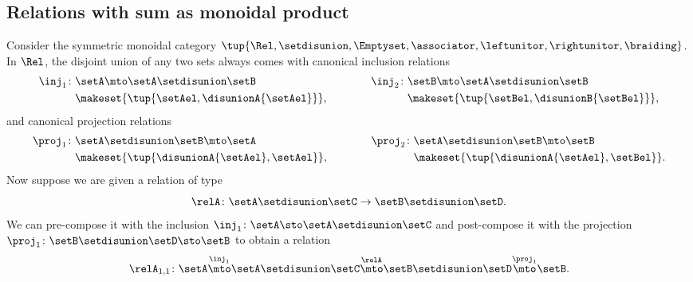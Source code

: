 

\subsection{Relations with sum as monoidal product}

Consider the symmetric monoidal category $\tup{\Rel, \setdisunion, \Emptyset, \associator, \leftunitor, \rightunitor, \braiding}$.
    In $\Rel$, the disjoint union of any two sets always comes with canonical inclusion relations
    \begin{equation}
        \begin{aligned}
            \inj_1 \colon & \setA \mto \setA\setdisunion\setB \\
                             & \makeset{ \tup{\setAel, \disunionA{\setAel}}},
        \end{aligned}
        \qquad \qquad
        \begin{aligned}
            \inj_2 \colon & \setB  \mto \setA\setdisunion\setB \\
                             & \makeset{ \tup{\setBel, \disunionB{\setBel}}},
        \end{aligned}
    \end{equation}
    and canonical projection relations
    \begin{equation}
        \begin{aligned}
            \proj_1 \colon & \setA\setdisunion\setB \mto \setA \\
                              & \makeset{ \tup{\disunionA{\setAel}, \setAel}},
        \end{aligned}
        \qquad \qquad
        \begin{aligned}
            \proj_2 \colon & \setA\setdisunion\setB  \mto \setB \\
                             & \makeset{ \tup{\disunionA{\setAel}, \setBel}}.
        \end{aligned}
    \end{equation}
    Now suppose we are given a relation of type
    \begin{equation}
        \relA \colon \setA \setdisunion \setC \to \setB \setdisunion \setD.
    \end{equation}
    We can pre-compose it with the inclusion $\inj_1 \colon \setA \sto \setA\setdisunion\setC$ and post-compose it with the projection $\proj_1 \colon \setB \setdisunion\setD \sto \setB$ to obtain a relation
    \begin{equation}
        \relA_{1,1} \colon \setA \overset{\inj_1}{\mto} \setA \setdisunion \setC \overset{\relA}{\mto} \setB \setdisunion \setD \overset{\proj_1}{\mto} \setB.
    \end{equation}

